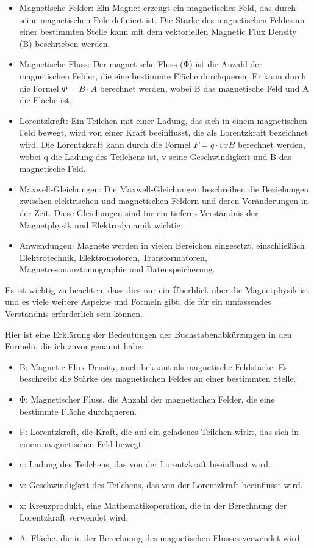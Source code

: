 \documentclass{report}
\begin{document}
\begin{itemize}
\item Magnetische Felder: Ein Magnet erzeugt ein magnetisches Feld, das durch seine magnetischen Pole definiert ist. Die Stärke des magnetischen Feldes an einer bestimmten Stelle kann mit dem vektoriellen Magnetic Flux Density (B) beschrieben werden.
\item Magnetische Fluss: Der magnetische Fluss (Φ) ist die Anzahl der magnetischen Felder, die eine bestimmte Fläche durchqueren. Er kann durch die Formel $Φ = B \cdot  A$ berechnet werden, wobei B das magnetische Feld und A die Fläche ist.
\item Lorentzkraft: Ein Teilchen mit einer Ladung, das sich in einem magnetischen Feld bewegt, wird von einer Kraft beeinflusst, die als Lorentzkraft bezeichnet wird. Die Lorentzkraft kann durch die Formel $F = q \cdot  v x B$ berechnet werden, wobei q die Ladung des Teilchens ist, v seine Geschwindigkeit und B das magnetische Feld.
\item Maxwell-Gleichungen: Die Maxwell-Gleichungen beschreiben die Beziehungen zwischen elektrischen und magnetischen Feldern und deren Veränderungen in der Zeit. Diese Gleichungen sind für ein tieferes Verständnis der Magnetphysik und Elektrodynamik wichtig.
\item Anwendungen: Magnete werden in vielen Bereichen eingesetzt, einschließlich Elektrotechnik, Elektromotoren, Transformatoren, Magnetresonanztomographie und Datenspeicherung.
\end{itemize}
Es ist wichtig zu beachten, dass dies nur ein Überblick über die Magnetphysik
ist und es viele weitere Aspekte und Formeln gibt, die für ein umfassendes
Verständnis erforderlich sein können.

Hier ist eine Erklärung der Bedeutungen der Buchstabenabkürzungen in den
Formeln, die ich zuvor genannt habe: 
\begin{itemize} 
\item B: Magnetic Flux Density, auch bekannt als magnetische Feldstärke. Es beschreibt die Stärke des magnetischen Feldes an einer bestimmten Stelle. 
\item Φ: Magnetischer Fluss, die Anzahl der magnetischen Felder, die eine bestimmte Fläche durchqueren. 
\item F: Lorentzkraft, die Kraft, die auf ein geladenes Teilchen wirkt, das sich in einem magnetischen Feld bewegt. 
\item q: Ladung des Teilchens, das von der Lorentzkraft beeinflusst wird. 
\item v: Geschwindigkeit des Teilchens, das von der Lorentzkraft beeinflusst wird.
\item x: Kreuzprodukt, eine Mathematikoperation, die in der Berechnung der Lorentzkraft verwendet wird. 
\item A: Fläche, die in der Berechnung des magnetischen Flusses verwendet wird.
\end{itemize}
\end{document}
